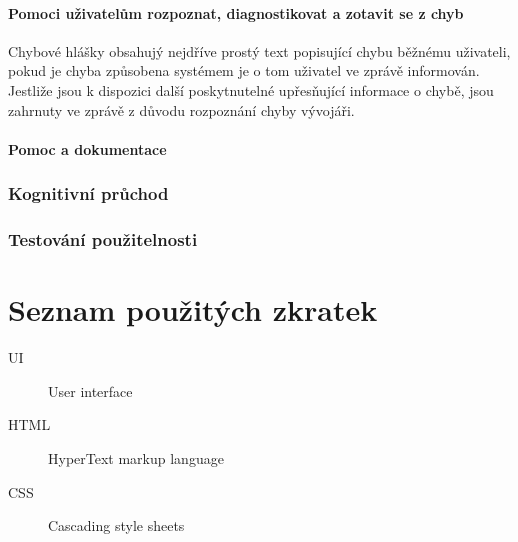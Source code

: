 \documentclass[thesis=B,czech]{FITthesis}[2012/06/26]
\begin{document}
	\subsubsection{Pomoci uživatelům rozpoznat, diagnostikovat a zotavit se z chyb}
	Chybové hlášky obsahujý nejdříve prostý text popisující chybu běžnému uživateli, pokud je chyba způsobena systémem je o tom uživatel ve zprávě informován. Jestliže jsou k dispozici další poskytnutelné upřesňující informace o chybě, jsou zahrnuty ve zprávě z důvodu rozpoznání chyby vývojáři.

	\subsubsection{Pomoc a dokumentace}

	\subsection{Kognitivní průchod}

	\subsection{Testování použitelnosti}

\begin{conclusion}
\end{conclusion}




\appendix

\chapter{Seznam použitých zkratek}
\begin{description}
	\item[UI] User interface
	\item[HTML] HyperText markup language
	\item[CSS] Cascading style sheets
\end{description}
\end{document}
